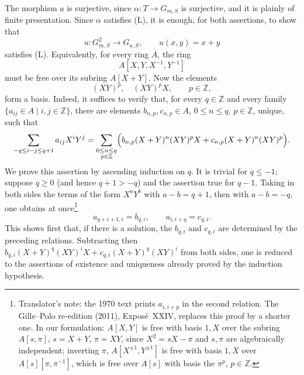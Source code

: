 The morphism \(a\) is surjective, since
\(\alpha:T\to G_{m,S}\) is surjective, and it is plainly of finite
presentation. Since \(\alpha\) satisfies \textup{(L)}, it is enough,
for both assertions, to show that
\[
  u:G_{m,S}^2\longrightarrow G_{a,S},
  \qquad
  u(x,y)=x+y
\]
satisfies \textup{(L)}. Equivalently, for every ring \(A\), the ring
\[
  A[X,Y,X^{-1},Y^{-1}]
\]
must be free over its subring \(A[X+Y]\). Now the elements
\[
  (XY)^p,\quad (XY)^pX,
  \qquad p\in\mathbb Z,
\]
form a basis. Indeed, it suffices to verify that, for every \(q\in\mathbb Z\) and every family
\(\{a_{ij}\in A\mid i,j\in\mathbb Z\}\), there are elements \(b_{n,p},c_{n,p}\in A\),
\(0\leq n\leq q\), \(p\in\mathbb Z\), unique, such that
\[
  \sum_{-q\leq i-j\leq q+1}a_{ij}X^iY^j
  =
  \sum_{\substack{0\leq n\leq q\\ p\in\mathbb Z}}
  \Bigl(b_{n,p}(X+Y)^n(XY)^pX+c_{n,p}(X+Y)^n(XY)^p\Bigr).
\]
We prove this assertion by ascending induction on \(q\). It is trivial for \(q\leq-1\); suppose
\(q\geq0\) (and hence \(q+1>-q\)) and the assertion true for \(q-1\). Taking in both sides the
terms of the form \(X^aY^b\) with \(a-b=q+1\), then with \(a-b=-q\), one obtains at once\footnote{Translator's note: the 1970 text prints \(a_{i,i+p}\) in the
second relation. The Gille--Polo re-edition (2011), Exposé~XXIV, replaces this proof by a shorter
one. In our formulation: \(A[X,Y]\) is free with basis \(1,X\) over the subring
\(A[s,\pi]\), \(s=X+Y\), \(\pi=XY\), since \(X^2=sX-\pi\) and \(s,\pi\) are algebraically
independent; inverting \(\pi\), \(A[X^{\pm1},Y^{\pm1}]\) is free with basis \(1,X\) over
\(A[s][\pi,\pi^{-1}]\), which is free over \(A[s]\) with basis the \(\pi^p\), \(p\in\mathbb Z\).}
\[
  a_{q+i+1,i}=b_{q,i},
  \qquad
  a_{i,i+q}=c_{q,i}.
\]
This shows first that, if there is a solution, the \(b_{q,i}\) and \(c_{q,i}\) are determined by
the preceding relations. Subtracting then
\(b_{q,i}(X+Y)^q(XY)^iX+c_{q,i}(X+Y)^q(XY)^i\) from both sides, one is reduced to the assertions
of existence and uniqueness already proved by the induction hypothesis.


